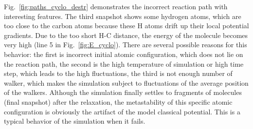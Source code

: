 \documentclass[preprint,12pt]{elsarticle}
\begin{document}


Fig.~\ref{fig:paths_cyclo_destr} demonstrates the incorrect reaction path with interesting features. The third snapshot shows some hydrogen atoms, which are too close to the carbon atoms because these H atoms drift up their local potential gradients. Due to the too short H-C distance, the energy of the molecule becomes very high (line 5 in Fig.~\ref{fig:E_cyclo}). There are several possible reasons for this behavior: the first is incorrect initial atomic configuration, which does not lie on the reaction path, the second is the high temperature of simulation or high time step, which leads to the high fluctuations, the third is not enough number of walker, which makes the simulation subject to fluctuations of the average position of the walkers. Although the simulation finally settles to fragments of molecules (final snapshot) after the relaxation, the metastability of this specific atomic configuration is obviously the artifact of the model classical potential. This is a typical behavior of the simulation when it fails.
\end{document}
